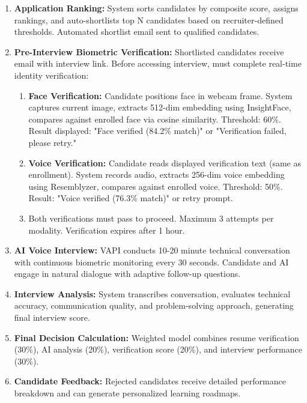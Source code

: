 \documentclass[conference]{IEEEtran}
\begin{document}
\begin{enumerate}
    \item \textbf{Application Ranking:} System sorts candidates by composite score, assigns rankings, and auto-shortlists top N candidates based on recruiter-defined thresholds. Automated shortlist email sent to qualified candidates.
    
    \item \textbf{Pre-Interview Biometric Verification:} Shortlisted candidates receive email with interview link. Before accessing interview, must complete real-time identity verification:
    \begin{enumerate}
        \item \textbf{Face Verification:} Candidate positions face in webcam frame. System captures current image, extracts 512-dim embedding using InsightFace, compares against enrolled face via cosine similarity. Threshold: 60\%. Result displayed: "Face verified (84.2\% match)" or "Verification failed, please retry."
        
        \item \textbf{Voice Verification:} Candidate reads displayed verification text (same as enrollment). System records audio, extracts 256-dim voice embedding using Resemblyzer, compares against enrolled voice. Threshold: 50\%. Result: "Voice verified (76.3\% match)" or retry prompt.
        
        \item Both verifications must pass to proceed. Maximum 3 attempts per modality. Verification expires after 1 hour.
    \end{enumerate}
    
    \item \textbf{AI Voice Interview:} VAPI conducts 10-20 minute technical conversation with continuous biometric monitoring every 30 seconds. Candidate and AI engage in natural dialogue with adaptive follow-up questions.
    
    \item \textbf{Interview Analysis:} System transcribes conversation, evaluates technical accuracy, communication quality, and problem-solving approach, generating final interview score.
    
    \item \textbf{Final Decision Calculation:} Weighted model combines resume verification (30\%), AI analysis (20\%), verification score (20\%), and interview performance (30\%).
    
    \item \textbf{Candidate Feedback:} Rejected candidates receive detailed performance breakdown and can generate personalized learning roadmaps.
\end{enumerate}
\end{document}
